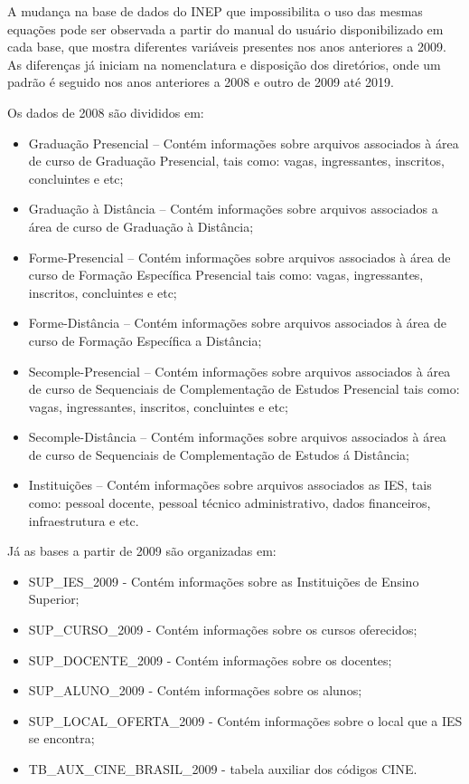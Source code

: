A mudança na base de dados do INEP que impossibilita o uso das mesmas equações pode ser observada a partir do manual do usuário disponibilizado em cada base, que mostra diferentes variáveis presentes nos anos anteriores a 2009. As diferenças já iniciam na nomenclatura e disposição dos diretórios, onde um padrão é seguido nos anos anteriores a 2008 e outro de 2009 até 2019.

Os dados de 2008 são divididos em:
\begin{itemize}
    \item Graduação Presencial – Contém informações sobre arquivos associados à área de curso de Graduação Presencial, tais como: vagas, ingressantes, inscritos, concluintes e etc;
    \item Graduação à Distância – Contém informações sobre arquivos associados a área de curso de Graduação à Distância;
    \item Forme-Presencial – Contém informações sobre arquivos associados à área de curso de Formação Específica Presencial tais como: vagas, ingressantes, inscritos, concluintes e etc;
    \item Forme-Distância – Contém informações sobre arquivos associados à área de curso de Formação Específica a Distância;
    \item Secomple-Presencial – Contém informações sobre arquivos associados à área de curso de Sequenciais de Complementação de Estudos Presencial tais como: vagas, ingressantes, inscritos, concluintes e etc;
    \item Secomple-Distância – Contém informações sobre arquivos associados à área de curso de Sequenciais de Complementação de Estudos á Distância;
    \item Instituições – Contém informações sobre arquivos associados as IES, tais como: pessoal docente, pessoal técnico administrativo, dados financeiros, infraestrutura e etc.
\end{itemize}
  
Já as bases a partir de 2009 são organizadas em:
\begin{itemize}
    \item SUP\_IES\_2009 - Contém informações sobre as Instituições de Ensino Superior;
    \item SUP\_CURSO\_2009 - Contém informações sobre os cursos oferecidos;
    \item SUP\_DOCENTE\_2009 - Contém informações sobre os docentes;
    \item SUP\_ALUNO\_2009 - Contém informações sobre os alunos;
    \item SUP\_LOCAL\_OFERTA\_2009 - Contém informações sobre o local que a IES se encontra;
    \item TB\_AUX\_CINE\_BRASIL\_2009 - tabela auxiliar dos códigos CINE.
\end{itemize}

